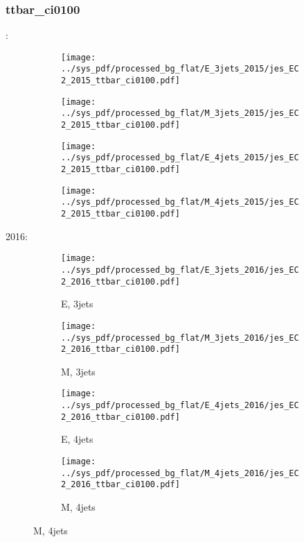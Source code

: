 \documentclass{beamer}
\begin{document}
\begin{frame}
\frametitle{ttbar_ci0100}
\fontsize{5}{1}:
\begin{figure}
\centering
\begin{subfigure}[b]{0.24\textwidth}
\texttt{[image: ../sys\_pdf/processed\_bg\_flat/E\_3jets\_2015/jes\_EC2\_2015\_ttbar\_ci0100.pdf]}
\end{subfigure}
\begin{subfigure}[b]{0.24\textwidth}
\texttt{[image: ../sys\_pdf/processed\_bg\_flat/M\_3jets\_2015/jes\_EC2\_2015\_ttbar\_ci0100.pdf]}
\end{subfigure}
\begin{subfigure}[b]{0.24\textwidth}
\texttt{[image: ../sys\_pdf/processed\_bg\_flat/E\_4jets\_2015/jes\_EC2\_2015\_ttbar\_ci0100.pdf]}
\end{subfigure}
\begin{subfigure}[b]{0.24\textwidth}
\texttt{[image: ../sys\_pdf/processed\_bg\_flat/M\_4jets\_2015/jes\_EC2\_2015\_ttbar\_ci0100.pdf]}
\end{subfigure}
\end{figure}
2016:
\begin{figure}
\centering
\begin{subfigure}[b]{0.24\textwidth}
\texttt{[image: ../sys\_pdf/processed\_bg\_flat/E\_3jets\_2016/jes\_EC2\_2016\_ttbar\_ci0100.pdf]}
\captionsetup{font=tiny}
\caption{E, 3jets}
\end{subfigure}
\begin{subfigure}[b]{0.24\textwidth}
\texttt{[image: ../sys\_pdf/processed\_bg\_flat/M\_3jets\_2016/jes\_EC2\_2016\_ttbar\_ci0100.pdf]}
\captionsetup{font=tiny}
\caption{M, 3jets}
\end{subfigure}
\begin{subfigure}[b]{0.24\textwidth}
\texttt{[image: ../sys\_pdf/processed\_bg\_flat/E\_4jets\_2016/jes\_EC2\_2016\_ttbar\_ci0100.pdf]}
\captionsetup{font=tiny}
\caption{E, 4jets}
\end{subfigure}
\begin{subfigure}[b]{0.24\textwidth}
\texttt{[image: ../sys\_pdf/processed\_bg\_flat/M\_4jets\_2016/jes\_EC2\_2016\_ttbar\_ci0100.pdf]}
\captionsetup{font=tiny}
\caption{M, 4jets}
\end{subfigure}
\end{figure}
\end{frame}
\end{document}
